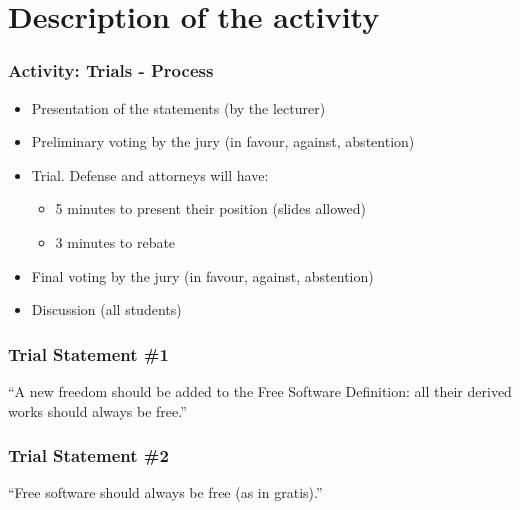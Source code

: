 

\section{Description of the activity}


\begin{frame}
\frametitle{Activity: Trials - Process}

\begin{itemize}
\item Presentation of the statements (by the lecturer)
\item Preliminary voting by the jury (in favour, against, abstention)
\item Trial. Defense and attorneys will have:
\begin{itemize}
  \item 5 minutes to present their position (slides allowed)
  \item 3 minutes to rebate
\end{itemize}
\item Final voting by the jury (in favour, against, abstention)
\item Discussion (all students)
\end{itemize}

\end{frame}


\begin{frame}
\frametitle{Trial Statement \#1}

\begin{center}
\begin{LARGE}
``A new freedom should be added to the Free Software Definition:
all their derived works should always be free.''
\end{LARGE}
\end{center}

\end{frame}



\begin{frame}
\frametitle{Trial Statement \#2}

\begin{center}
\begin{LARGE}
``Free software should always be free (as in gratis).''
\end{LARGE}
\end{center}

\end{frame}



